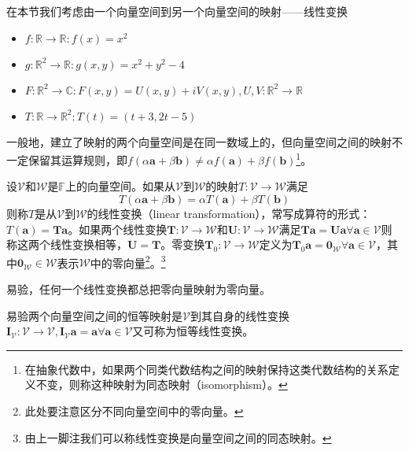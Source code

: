\documentclass[main.tex]{subfiles}
\begin{document}
在本节我们考虑由一个向量空间到另一个向量空间的映射——线性变换

\begin{example}
\quad
\begin{itemize}
    \item $f:\mathbb{R}\rightarrow\mathbb{R}:f\left(x\right)=x^2$
    \item $g:\mathbb{R}^2\rightarrow\mathbb{R}:g\left(x,y\right)=x^2+y^2-4$
    \item $F:\mathbb{R}^2\rightarrow\mathbb{C}:F\left(x,y\right)=U\left(x,y\right)+iV\left(x,y\right),U,V:\mathbb{R}^2\rightarrow\mathbb{R}$
    \item $T:\mathbb{R}\rightarrow\mathbb{R}^2:T\left(t\right)=\left(t+3,2t-5\right)$
\end{itemize}
\end{example}

一般地，建立了映射的两个向量空间是在同一数域上的，但向量空间之间的映射不一定保留其运算规则，即$f\left(\alpha\mathbf{a}+\beta\mathbf{b}\right)\neq\alpha f\left(\mathbf{a}\right)+\beta f\left(\mathbf{b}\right)$\footnote{在抽象代数中，如果两个同类代数结构之间的映射保持这类代数结构的关系定义不变，则称这种映射为同态映射（isomorphism）。}。

\begin{definition}[线性变换]\label{def:II.4.1}
设$\mathcal{V}$和$\mathcal{W}$是$\mathbb{F}$上的向量空间。如果从$\mathcal{V}$到$\mathcal{W}$的映射$T:\mathcal{V}\rightarrow\mathcal{W}$满足
\[T\left(\alpha\mathbf{a}+\beta\mathbf{b}\right)=\alpha T\left(\mathbf{a}\right)+\beta T\left(\mathbf{b}\right)\]
则称$T$是从$\mathcal{V}$到$\mathcal{W}$的线性变换（linear transformation），常写成算符的形式：$T\left(\mathbf{a}\right)=\mathbf{Ta}$。如果两个线性变换$\mathbf{T}:\mathcal{V}\rightarrow\mathcal{W}$和$\mathbf{U}:\mathcal{V}\rightarrow\mathcal{W}$满足$\mathbf{Ta}=\mathbf{Ua}\forall\mathbf{a}\in\mathcal{V}$则称这两个线性变换相等，$\mathbf{U}=\mathbf{T}$。零变换$\mathbf{T}_0:\mathcal{V}\rightarrow\mathcal{W}$定义为$\mathbf{T}_0\mathbf{a}=\mathbf{0}_\mathcal{W}\forall\mathbf{a}\in\mathcal{V}$，其中$\mathbf{0}_\mathcal{W}\in\mathcal{W}$表示$\mathcal{W}$中的零向量\footnote{此处要注意区分不同向量空间中的零向量。}。\footnote{由上一脚注我们可以称线性变换是向量空间之间的同态映射。}
\end{definition}

易验，任何一个线性变换都总把零向量映射为零向量。

易验两个向量空间之间的恒等映射是$\mathcal{V}$到其自身的线性变换$\mathbf{I}_\mathcal{V}:\mathcal{V}\rightarrow\mathcal{V},\mathbf{I}_\mathcal{V}\mathbf{a}=\mathbf{a}\forall\mathbf{a}\in\mathcal{V}$又可称为恒等线性变换。
\end{document}
